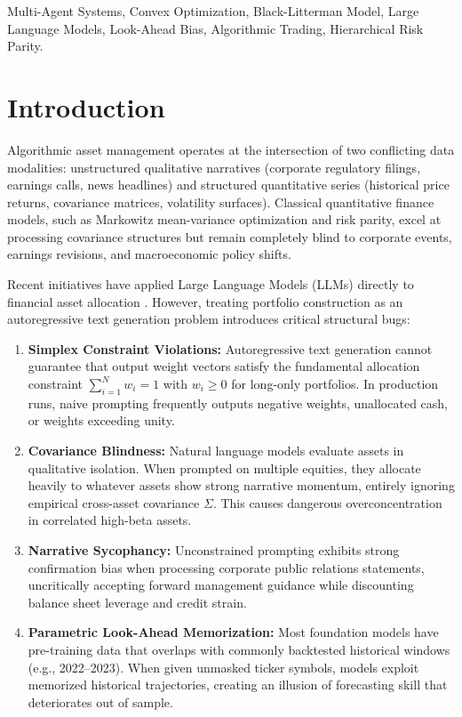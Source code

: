 \documentclass[conference]{IEEEtran}
\begin{document}
\begin{IEEEkeywords}
Multi-Agent Systems, Convex Optimization, Black-Litterman Model, Large Language Models, Look-Ahead Bias, Algorithmic Trading, Hierarchical Risk Parity.
\end{IEEEkeywords}

\section{Introduction}

Algorithmic asset management operates at the intersection of two conflicting data modalities: unstructured qualitative narratives (corporate regulatory filings, earnings calls, news headlines) and structured quantitative series (historical price returns, covariance matrices, volatility surfaces). Classical quantitative finance models, such as Markowitz mean-variance optimization \cite{markowitz1952} and risk parity, excel at processing covariance structures but remain completely blind to corporate events, earnings revisions, and macroeconomic policy shifts.

Recent initiatives have applied Large Language Models (LLMs) directly to financial asset allocation \cite{wu2023bloomberg, yu2023finmem, xiao2024tradingagents}. However, treating portfolio construction as an autoregressive text generation problem introduces critical structural bugs:

\begin{enumerate}
    \item \textbf{Simplex Constraint Violations:} Autoregressive text generation cannot guarantee that output weight vectors satisfy the fundamental allocation constraint $\sum_{i=1}^N w_i = 1$ with $w_i \ge 0$ for long-only portfolios. In production runs, naive prompting frequently outputs negative weights, unallocated cash, or weights exceeding unity.
    \item \textbf{Covariance Blindness:} Natural language models evaluate assets in qualitative isolation. When prompted on multiple equities, they allocate heavily to whatever assets show strong narrative momentum, entirely ignoring empirical cross-asset covariance $\Sigma$. This causes dangerous overconcentration in correlated high-beta assets.
    \item \textbf{Narrative Sycophancy:} Unconstrained prompting exhibits strong confirmation bias when processing corporate public relations statements, uncritically accepting forward management guidance while discounting balance sheet leverage and credit strain.
    \item \textbf{Parametric Look-Ahead Memorization:} Most foundation models have pre-training data that overlaps with commonly backtested historical windows (e.g., 2022--2023). When given unmasked ticker symbols, models exploit memorized historical trajectories, creating an illusion of forecasting skill that deteriorates out of sample.
\end{enumerate}
\end{document}
